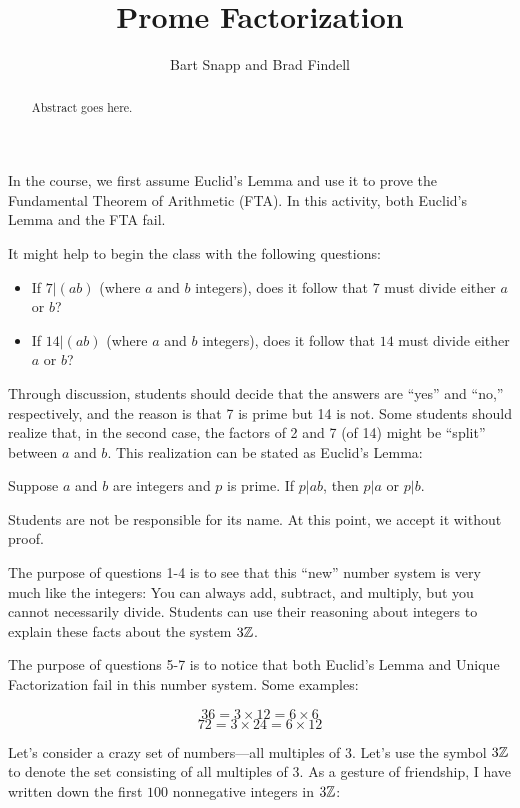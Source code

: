 \documentclass{ximera}
\title{Prome Factorization}
\author{Bart Snapp and Brad Findell}
\begin{document}
\begin{abstract}
Abstract goes here.  
\end{abstract}
\maketitle

\label{A:Prome}

\begin{teachingnote}
In the course, we first assume Euclid's Lemma and use it to prove the Fundamental Theorem of Arithmetic (FTA).  In this activity, both Euclid's Lemma and the FTA fail.

It might help to begin the class with the following questions:  
\begin{itemize}
\item If $7|(ab)$ (where $a$ and $b$ integers), does it follow that $7$ must divide either $a$ or $b$? 
\item If $14|(ab)$ (where $a$ and $b$ integers), does it follow that $14$ must divide either $a$ or $b$? 
\end{itemize}

Through discussion, students should decide that the answers are ``yes'' and ``no,'' respectively, and the reason is that 7 is prime but 14 is not.  Some students should realize that, in the second case, the factors of 2 and 7 (of 14) might be ``split'' between $a$ and $b$.  This realization can be stated as Euclid's Lemma:  

\begin{center}
Suppose $a$ and $b$ are integers and $p$ is prime.  If $p|ab$, then $p|a$ or $p|b$.  
\end{center}

Students are not be responsible for its name.  At this point, we accept it without proof.  

The purpose of questions 1-4 is to see that this ``new'' number system is very much like the integers:  You can always add, subtract, and multiply, but you cannot necessarily divide.  Students can use their reasoning about integers to explain these facts about the system $3\mathbb Z$.  

The purpose of questions 5-7 is to notice that both Euclid's Lemma and Unique Factorization fail in this number system.  Some examples:  

$$36 = 3\times 12 = 6\times 6$$
$$72 = 3\times 24=6\times 12$$
\end{teachingnote}


Let's consider a crazy set of numbers---all multiples of $3$. Let's
use the symbol $3\mathbb Z$ to denote the set consisting of all multiples of
$3$. As a gesture of friendship, I have written down the first $100$
nonnegative integers in $3\mathbb Z$:
\end{document}

